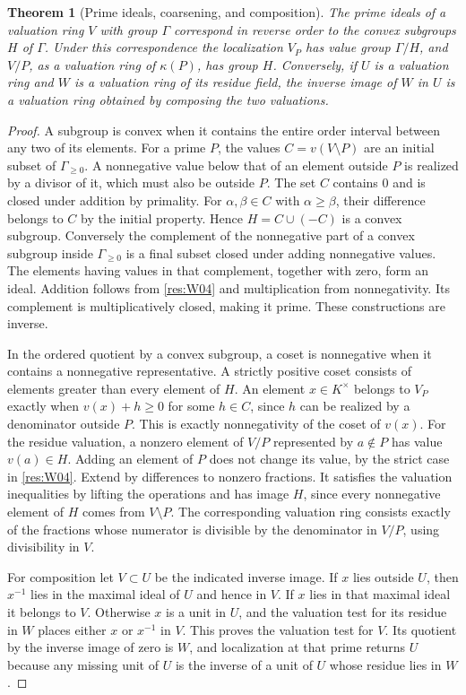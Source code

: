 \documentclass[11pt,oneside,openany]{book}
\newtheorem{theorem}{Theorem}[chapter]
\theoremstyle{definition}
\theoremstyle{remark}
\begin{document}
\begin{theorem}[Prime ideals, coarsening, and composition]\label{res:W05}
The prime ideals of a valuation ring \(V\) with group \(\Gamma\) correspond in reverse order to the convex subgroups \(H\) of \(\Gamma\). Under this correspondence the localization \(V_P\) has value group \(\Gamma/H\), and \(V/P\), as a valuation ring of \(\kappa(P)\), has group \(H\). Conversely, if \(U\) is a valuation ring and \(W\) is a valuation ring of its residue field, the inverse image of \(W\) in \(U\) is a valuation ring obtained by composing the two valuations.
\end{theorem}
\begin{proof}
A subgroup is convex when it contains the entire order interval between any two of its elements. For a prime \(P\), the values \(C=v(V\setminus P)\) are an initial subset of \(\Gamma_{\ge0}\). A nonnegative value below that of an element outside \(P\) is realized by a divisor of it, which must also be outside \(P\). The set \(C\) contains \(0\) and is closed under addition by primality. For \(\alpha,\beta\in C\) with \(\alpha\ge\beta\), their difference belongs to \(C\) by the initial property. Hence \(H=C\cup(-C)\) is a convex subgroup. Conversely the complement of the nonnegative part of a convex subgroup inside \(\Gamma_{\ge0}\) is a final subset closed under adding nonnegative values. The elements having values in that complement, together with zero, form an ideal. Addition follows from \ref{res:W04} and multiplication from nonnegativity. Its complement is multiplicatively closed, making it prime. These constructions are inverse.

In the ordered quotient by a convex subgroup, a coset is nonnegative when it contains a nonnegative representative. A strictly positive coset consists of elements greater than every element of \(H\). An element \(x\in K^\times\) belongs to \(V_P\) exactly when \(v(x)+h\ge0\) for some \(h\in C\), since \(h\) can be realized by a denominator outside \(P\). This is exactly nonnegativity of the coset of \(v(x)\). For the residue valuation, a nonzero element of \(V/P\) represented by \(a\notin P\) has value \(v(a)\in H\). Adding an element of \(P\) does not change its value, by the strict case in \ref{res:W04}. Extend by differences to nonzero fractions. It satisfies the valuation inequalities by lifting the operations and has image \(H\), since every nonnegative element of \(H\) comes from \(V\setminus P\). The corresponding valuation ring consists exactly of the fractions whose numerator is divisible by the denominator in \(V/P\), using divisibility in \(V\).

For composition let \(V\subset U\) be the indicated inverse image. If \(x\) lies outside \(U\), then \(x^{-1}\) lies in the maximal ideal of \(U\) and hence in \(V\). If \(x\) lies in that maximal ideal it belongs to \(V\). Otherwise \(x\) is a unit in \(U\), and the valuation test for its residue in \(W\) places either \(x\) or \(x^{-1}\) in \(V\). This proves the valuation test for \(V\). Its quotient by the inverse image of zero is \(W\), and localization at that prime returns \(U\) because any missing unit of \(U\) is the inverse of a unit of \(U\) whose residue lies in \(W\).
\end{proof}
\end{document}
